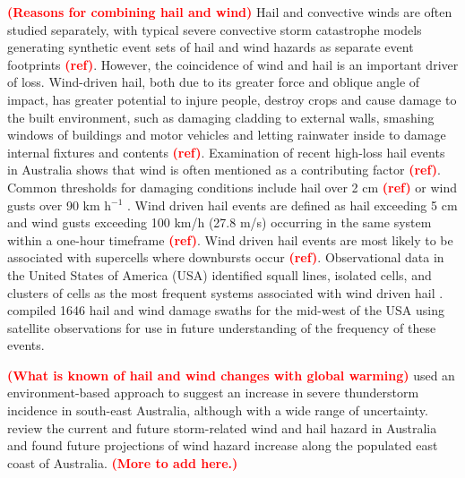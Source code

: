 \documentclass[]{agujournal2019}\usepackage[]{graphicx}\usepackage[]{xcolor}
\newcommand*{\todo}[1]{\textbf{\textcolor{red}{(#1)}}}
\newcommand*{\mref}{\todo{ref}}
\begin{document}
\todo{Reasons for combining hail and wind} Hail and convective winds are often studied separately, with typical severe convective storm catastrophe models generating synthetic event sets of hail and wind hazards as separate event footprints \mref{}. However, the coincidence of wind and hail is an important driver of loss. Wind-driven hail, both due to its greater force and oblique angle of impact, has greater potential to injure people, destroy crops \cite{Changnon_JAMC_1967, Towery_JAMC_1976} and cause damage to the built environment, such as damaging cladding to external walls, smashing windows of buildings and motor vehicles and letting rainwater inside to damage internal fixtures and contents \mref{}. Examination of recent high-loss hail events in Australia shows that wind is often mentioned as a contributing factor \mref{}. Common thresholds for damaging conditions include hail over 2 cm \mref{} or wind gusts over 90 km h$^{-1}$ \cite{Allen_2018}. Wind driven hail events are defined as hail exceeding 5 cm and wind gusts exceeding 100 km/h (27.8 m/s) occurring in the same system within a one-hour timeframe \mref{}. Wind driven hail events are most likely to be associated with supercells where downbursts occur \mref{}. Observational data in the United States of America (USA) identified squall lines, isolated cells, and clusters of cells as the most frequent systems associated with wind driven hail \cite{Carletta_2010}. \cite{Bell_WF_2023} compiled 1646 hail and wind damage swaths for the mid-west of the USA using satellite observations for use in future understanding of the frequency of these events.

\todo{What is known of hail and wind changes with global warming} \cite{Allen_JC_2014} used an environment-based approach to suggest an increase in severe thunderstorm incidence in south-east Australia, although with a wide range of uncertainty. \cite{Walsh_CC_2016} review the current and future storm-related wind and hail hazard in Australia and found future projections of wind hazard increase along the populated east coast of Australia. \todo{More to add here.}
\end{document}
